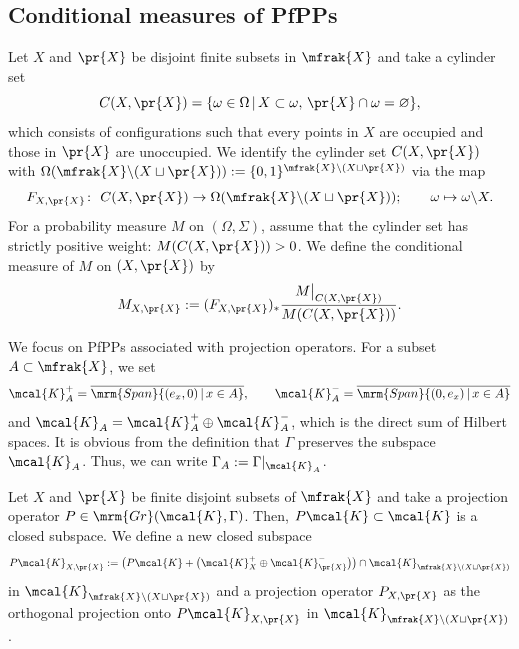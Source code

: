\subsection{Conditional measures of PfPPs}
Let $X$ and $\pr{X}$ be disjoint finite subsets in $\mfrak{X}$ and take a cylinder set
\begin{equation*}
	C(X,\pr{X})=\{\omega\in \Omega\,|\, X\subset \omega,\, \pr{X}\cap\omega=\varnothing\},
\end{equation*}
which consists of configurations such that every points in $X$ are occupied and those in $\pr{X}$ are unoccupied.
We identify the cylinder set $C(X,\pr{X})$ with $\Omega (\mfrak{X}\backslash (X\sqcup\pr{X})):=\{0,1\}^{\mfrak{X}\backslash (X\sqcup\pr{X})}$ via the map
\begin{equation*}
	F_{X,\pr{X}}\colon \ C(X,\pr{X})\to \Omega (\mfrak{X}\backslash (X\sqcup\pr{X}));\qquad \omega\mapsto \omega\backslash X.
\end{equation*}
For a probability measure $M$ on $(\Omega,\Sigma)$, assume that the cylinder set has strictly positive weight: $M(C(X,\pr{X}))>0$.
We define the conditional measure of $M$ on $(X,\pr{X})$ by
\begin{equation*}
	M_{X,\pr{X}}:=(F_{X,\pr{X}})_{\ast}\frac{M\big|_{C(X,\pr{X})}}{M(C(X,\pr{X}))}.
\end{equation*}

We focus on PfPPs associated with projection operators.
For a subset $A\subset\mfrak{X}$, we set
\begin{equation*}
	\mcal{K}_{A}^{+}=\overline{\mrm{Span}\{(e_{x},0)\,|\,x\in A\}},\qquad \mcal{K}^{-}_{A}=\overline{\mrm{Span}\{(0,e_{x})\,|\,x\in A\}}
\end{equation*}
and $\mcal{K}_{A}=\mcal{K}_{A}^{+}\oplus\mcal{K}_{A}^{-}$, which is the direct sum of Hilbert spaces.
It is obvious from the definition that $\Gamma$ preserves the subspace $\mcal{K}_{A}$. Thus, we can write $\Gamma_{A}:=\Gamma|_{\mcal{K}_{A}}$.

Let $X$ and $\pr{X}$ be finite disjoint subsets of $\mfrak{X}$ and take a projection operator $P\in \mrm{Gr}(\mcal{K},\Gamma)$.
Then, $P\mcal{K}\subset\mcal{K}$ is a closed subspace. We define a new closed subspace
\begin{equation*}
	P\mcal{K}_{X,\pr{X}}:=\big(P\mcal{K}+\big(\mcal{K}_{X}^{+}\oplus \mcal{K}^{-}_{\pr{X}}\big)\big)\cap \mcal{K}_{\mfrak{X}\backslash (X\sqcup\pr{X})}
\end{equation*}
in $\mcal{K}_{\mfrak{X}\backslash (X\sqcup\pr{X})}$ and a projection operator $P_{X,\pr{X}}$ as the orthogonal projection onto $P\mcal{K}_{X,\pr{X}}$ in $\mcal{K}_{\mfrak{X}\backslash (X\sqcup\pr{X})}$.

